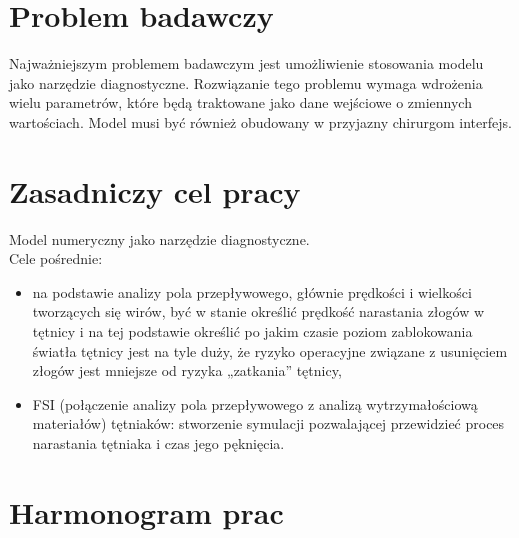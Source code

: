 \documentclass[11pt]{article} %
\begin{document}

\section{Problem badawczy}

Najważniejszym problemem badawczym jest umożliwienie stosowania modelu jako narzędzie diagnostyczne. Rozwiązanie tego problemu wymaga wdrożenia wielu parametrów, które będą traktowane jako dane wejściowe o zmiennych wartościach. Model musi być również obudowany w przyjazny chirurgom interfejs.


\section{Zasadniczy cel pracy}

Model numeryczny jako narzędzie diagnostyczne.\\

Cele pośrednie:
\begin{itemize}
\item na podstawie analizy pola przepływowego, głównie prędkości i wielkości tworzących się wirów, być w stanie określić prędkość narastania złogów w tętnicy             i na tej podstawie określić po jakim czasie poziom zablokowania światła tętnicy jest na tyle duży, że ryzyko operacyjne związane z usunięciem złogów jest mniejsze od ryzyka „zatkania” tętnicy,
\item FSI (połączenie analizy pola przepływowego z analizą wytrzymałościową materiałów) tętniaków: stworzenie symulacji pozwalającej przewidzieć proces narastania tętniaka i czas jego pęknięcia.
\end{itemize}



\section{Harmonogram prac}
\end{document}
